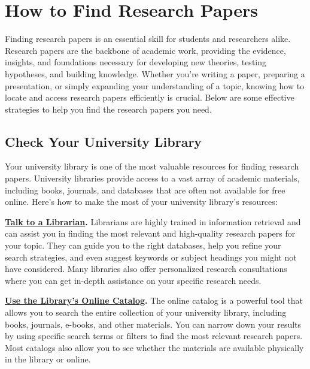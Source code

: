\documentclass[
]{book}
\begin{document}
\section{How to Find Research Papers}\label{find}

Finding research papers is an essential skill for students and researchers alike. Research papers are the backbone of academic work, providing the evidence, insights, and foundations necessary for developing new theories, testing hypotheses, and building knowledge. Whether you're writing a paper, preparing a presentation, or simply expanding your understanding of a topic, knowing how to locate and access research papers efficiently is crucial. Below are some effective strategies to help you find the research papers you need.

\subsection*{Check Your University Library}\label{check-your-university-library}

Your university library is one of the most valuable resources for finding research papers. University libraries provide access to a vast array of academic materials, including books, journals, and databases that are often not available for free online. Here's how to make the most of your university library's resources:

\href{https://www.siue.edu/lovejoy-library/ask-a-librarian/}{\textbf{Talk to a Librarian}}\textbf{.} Librarians are highly trained in information retrieval and can assist you in finding the most relevant and high-quality research papers for your topic. They can guide you to the right databases, help you refine your search strategies, and even suggest keywords or subject headings you might not have considered. Many libraries also offer personalized research consultations where you can get in-depth assistance on your specific research needs.

\href{https://i-share-sie.primo.exlibrisgroup.com/discovery/search?vid=01CARLI_SIE:CARLI_SIE&lang=en}{\textbf{Use the Library's Online Catalog}}\textbf{.} The online catalog is a powerful tool that allows you to search the entire collection of your university library, including books, journals, e-books, and other materials. You can narrow down your results by using specific search terms or filters to find the most relevant research papers. Most catalogs also allow you to see whether the materials are available physically in the library or online.
\end{document}
